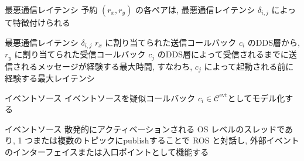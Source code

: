 \begin{frame}{最悪通信レイテンシ}
    予約 $\left(r_{x}, r_{y}\right)$ の各ペアは, 最悪通信レイテンシ $\delta_{i, j}$ によって特徴付けられる
    \begin{block}{最悪通信レイテンシ $\delta_{i, j}$}
        $r_x$ に割り当てられた送信コールバック $c_i$ のDDS層から, $r_y$ に割り当てられた受信コールバック $c_j$ のDDS層によって受信されるまでに送信されるメッセージが経験する最大時間, すなわち, $c_j$ によって起動される前に経験する最大レイテンシ
    \end{block}
\end{frame}

\begin{frame}{イベントソース}
    イベントソースを疑似コールバック $c_{i} \in \mathcal{C}^{\text {evt}}$としてモデル化する
    \begin{block}{イベントソース}
        散発的にアクティベーションされる OS レベルのスレッドであり, 1 つまたは複数のトピックにpublishすることで ROS と対話し, 外部イベントのインターフェイスまたは入口ポイントとして機能する
    \end{block}
\end{frame}
